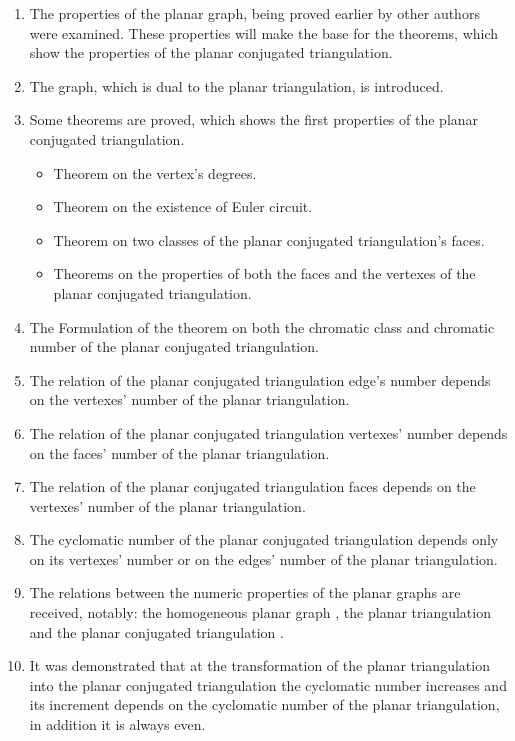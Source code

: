 \documentclass{amsart}
\theoremstyle{plain}
\numberwithin{equation}{section}
\begin{document}
\begin{enumerate}
\item	
The properties of the planar graph, being proved earlier by other authors were examined. These properties will make the base for the theorems, which show the properties of the planar conjugated triangulation.
\item	
The graph, which is dual to the planar triangulation, is introduced.
\item	
Some theorems are proved, which shows the first properties of the planar conjugated triangulation.

\begin {itemize}
\item	
Theorem on the vertex's degrees.
\item	
Theorem on the existence of Euler circuit.
\item	
Theorem on two classes of the planar conjugated triangulation's faces.
\item	
Theorems on the properties of both the faces and the vertexes of the planar conjugated triangulation.
\end{itemize}
	
\item	
The Formulation of the theorem on both the chromatic class and chromatic number of the planar conjugated triangulation.

\item	
The relation of the planar conjugated triangulation edge's number depends on the vertexes' number of the planar triangulation.
	
\item	
The relation of the planar conjugated triangulation vertexes' number depends on the faces' number of the planar triangulation.
	
\item	
The relation of the planar conjugated triangulation faces depends on the vertexes' number of the planar triangulation.
	
\item	
The cyclomatic number of the planar conjugated triangulation depends only on its vertexes' number or on the edges' number of the planar triangulation.

\item 
The relations between the numeric properties of the planar graphs are received, notably: the homogeneous planar graph , the planar triangulation  and the planar conjugated triangulation .

\item 
It was demonstrated that at the transformation of the planar triangulation  into the planar conjugated triangulation  the cyclomatic number increases and its increment depends on the cyclomatic number of the planar triangulation, in addition it is always even.


\end{enumerate}
\end{document}
